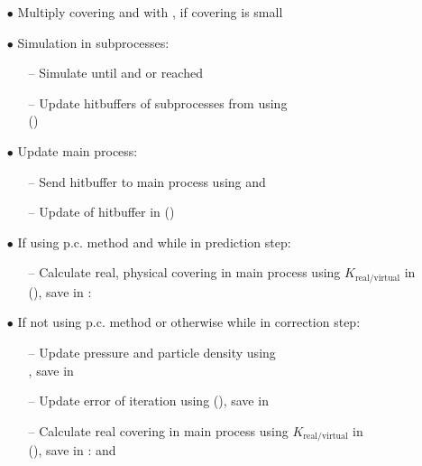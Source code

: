 \begin{itemize}[noitemsep,topsep=0pt, partopsep=0pt]
\begin{itemize}[noitemsep,topsep=0pt, partopsep=0pt]
	\item[$\bullet$] Multiply covering and  with , if covering is small
	\item[$\bullet$] Simulation in subprocesses:
	\begin{itemize}[noitemsep,topsep=0pt, partopsep=0pt]
	\item[--] Simulate until  and  or  reached
	\item[--] Update hitbuffers of subprocesses from  using \\()
	\end{itemize}
	\item[$\bullet$] Update main process:
		\begin{itemize}[noitemsep,topsep=0pt, partopsep=0pt]
		\item[--] Send hitbuffer to main process using  and 
		\item[--] Update of hitbuffer in  ()
		\end{itemize}
	\item[$\bullet$]{If using p.c. method and while in prediction step:}
	\begin{itemize}[noitemsep,topsep=0pt, partopsep=0pt]
	\item[--] Calculate real, physical covering in main process using $K_{\text{real}/\text{virtual}}$ in \\(), save in : 
	\end{itemize}
	\item[$\bullet$]{If not using p.c. method or otherwise while in correction step:}
	\begin{itemize}[noitemsep,topsep=0pt, partopsep=0pt]
	\item [--] Update pressure and particle density using \\, save in 
	\item[--] Update error of iteration using  (), save in 
	\item[--] Calculate real covering in main process using $K_{\text{real}/\text{virtual}}$ in \\(), save in :  and 

\end{itemize}
\end{itemize}
\end{itemize}
